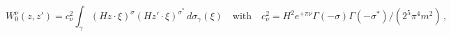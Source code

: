 \begin{equation*}
 W^\nu_{0}(z,z')= c_\nu^{2}\int_\gamma
(Hz\cdot\xi)^{\sigma}(H z'\cdot \xi
)^{\sigma^{*}}\,d\sigma_\gamma(\xi)\quad\mbox{with}\quad
c_{\nu}^{2}=H^2e^{+\pi\nu}\Gamma(-\sigma) \Gamma (-\sigma^*)/(2^5
\pi^4m^2)\,,
\end{equation*}

